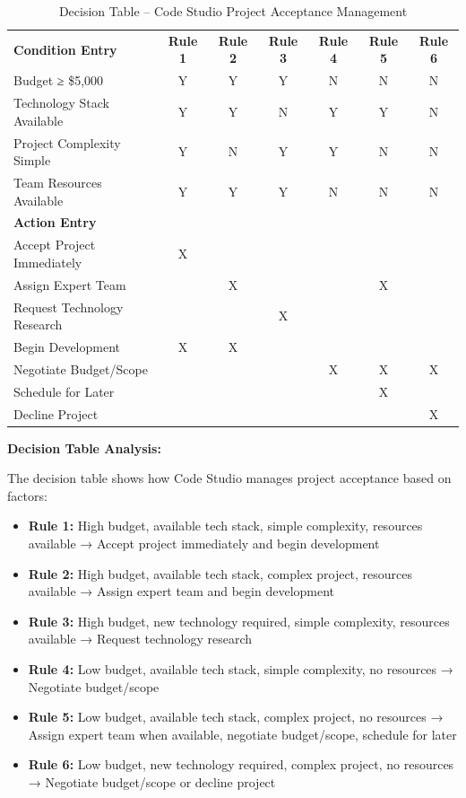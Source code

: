\documentclass[12pt,a4paper]{article}
\begin{document}
\begin{table}[H]
\centering
\renewcommand{\arraystretch}{1.3}
\begin{tabular}{|p{4cm}|c|c|c|c|c|c|}
\hline
\rowcolor{orange!20}
\multicolumn{7}{|c|}{\textbf{Code Studio Project Acceptance Decision Table}} \\
\hline
\rowcolor{orange!10}
\textbf{Condition Entry} & \textbf{Rule 1} & \textbf{Rule 2} & \textbf{Rule 3} & \textbf{Rule 4} & \textbf{Rule 5} & \textbf{Rule 6} \\
\hline
Budget ≥ \$5,000 & Y & Y & Y & N & N & N \\
\hline
Technology Stack Available & Y & Y & N & Y & Y & N \\
\hline
Project Complexity Simple & Y & N & Y & Y & N & N \\
\hline
Team Resources Available & Y & Y & Y & N & N & N \\
\hline
\rowcolor{orange!10}
\textbf{Action Entry} & & & & & & \\
\hline
Accept Project Immediately & X & & & & & \\
\hline
Assign Expert Team & & X & & & X & \\
\hline
Request Technology Research & & & X & & & \\
\hline
Begin Development & X & X & & & & \\
\hline
Negotiate Budget/Scope & & & & X & X & X \\
\hline
Schedule for Later & & & & & X & \\
\hline
Decline Project & & & & & & X \\
\hline
\end{tabular}
\caption{Decision Table – Code Studio Project Acceptance Management}
\end{table}

{\color{orange!80}\large \textbf{Decision Table Analysis:}}

The decision table shows how Code Studio manages project acceptance based on factors:

\begin{itemize}
\item \textbf{Rule 1:} High budget, available tech stack, simple complexity, resources available → Accept project immediately and begin development
\item \textbf{Rule 2:} High budget, available tech stack, complex project, resources available → Assign expert team and begin development
\item \textbf{Rule 3:} High budget, new technology required, simple complexity, resources available → Request technology research
\item \textbf{Rule 4:} Low budget, available tech stack, simple complexity, no resources → Negotiate budget/scope
\item \textbf{Rule 5:} Low budget, available tech stack, complex project, no resources → Assign expert team when available, negotiate budget/scope, schedule for later
\item \textbf{Rule 6:} Low budget, new technology required, complex project, no resources → Negotiate budget/scope or decline project
\end{itemize}
\end{document}
